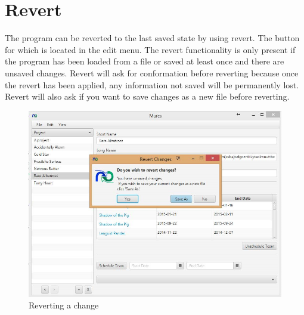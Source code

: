 \section{Revert}

The program can be reverted to the last saved state by using revert. The button for which is located in the edit menu.
The revert functionality is only present if the program has been loaded from a file or saved at least once and there are unsaved changes.
Revert will ask for conformation before reverting because once the revert has been applied, any information not saved will be permanently lost.
Revert will also ask if you want to save changes as a new file before reverting.
\newline\newline


\begin{figure}[H]
\centering
\includegraphics[width=\textwidth]{images/screenshots/revert1.PNG}
\caption{Reverting a change}
\label{fig:revert}
\end{figure}